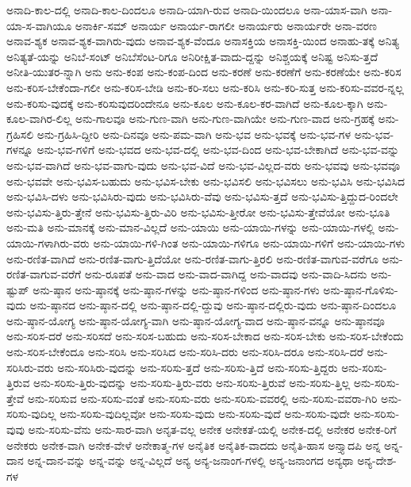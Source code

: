 {ಅನಾದಿ-ಕಾಲ-ದಲ್ಲಿ
ಅನಾದಿ-ಕಾಲ-ದಿಂದಲೂ
ಅನಾದಿ-ಯಾಗಿ-ರುವ
ಅನಾದಿ-ಯಿಂದಲೂ
ಅನಾ-ಯಾಸ-ವಾಗಿ
ಅನಾ-ಯಾ-ಸ-ವಾಗಿಯೂ
ಅನಾರ್ಕಿ-ಸಮ್
ಅನಾರ್ಯ
ಅನಾರ್ಯ-ರಾಗಲೀ
ಅನಾರ್ಯರು
ಅನಾರ್ಯರೇ
ಅನಾ-ವರಣ
ಅನಾವ-ಶ್ಯಕ
ಅನಾವ-ಶ್ಯಕ-ವಾಗಿರು-ವುದು
ಅನಾವ-ಶ್ಯಕ-ವೆಂದೂ
ಅನಾಸಕ್ತಿಯ
ಅನಾಸಕ್ತಿ-ಯಿಂದ
ಅನಾಹು-ತಕ್ಕೆ
ಅನಿತ್ಯ
ಅನಿತ್ಯತೆ-ಯನ್ನು
ಅನಿಬೆ-ಸಂಟ್
ಅನಿಬೆಸೆಂಟ-ರಿಗೂ
ಅನಿರೀಕ್ಷಿತ-ವಾದು-ದ್ದನ್ನು
ಅನಿಶ್ಚಯಕ್ಕೆ
ಅನಿಷ್ಟ
ಅನಿಸು-ತ್ತದೆ
ಅನೀತಿ-ಯುತರ-ನ್ನಾಗಿ
ಅನು
ಅನು-ಕಂಪ
ಅನು-ಕಂಪ-ದಿಂದ
ಅನು-ಕರಣೆ
ಅನು-ಕರಣೆಗೆ
ಅನು-ಕರಣೆಯೇ
ಅನು-ಕರಿಸ
ಅನು-ಕರಿಸ-ಬೇಕೆಂದಾ-ಗಲೀ
ಅನು-ಕರಿಸ-ಬೇಡಿ
ಅನು-ಕರಿ-ಸಲು
ಅನು-ಕರಿಸಿ
ಅನು-ಕರಿ-ಸುತ್ತ
ಅನು-ಕರಿಸು-ವವರ-ನ್ನಲ್ಲ
ಅನು-ಕರಿಸು-ವುದಕ್ಕೆ
ಅನು-ಕರಿಸುವುದರಿಂದೇನೂ
ಅನು-ಕೂಲ
ಅನು-ಕೂಲ-ಕರ-ವಾಗಿದೆ
ಅನು-ಕೂಲ-ಕ್ಕಾಗಿ
ಅನು-ಕೂಲ-ವಾಗಿರ-ಲಿಲ್ಲ
ಅನು-ಗಾಲವೂ
ಅನು-ಗುಣ-ವಾಗಿ
ಅನು-ಗುಣ-ವಾಗಿಯೇ
ಅನು-ಗುಣ-ವಾದ
ಅನು-ಗ್ರಹಕ್ಕೆ
ಅನು-ಗ್ರಹಿಸಲಿ
ಅನು-ಗ್ರಹಿಸಿ-ದ್ದೀರಿ
ಅನು-ದಿನವೂ
ಅನು-ಪಮ-ವಾಗಿ
ಅನು-ಭವ
ಅನು-ಭವಕ್ಕೆ
ಅನು-ಭವ-ಗಳ
ಅನು-ಭವ-ಗಳನ್ನೂ
ಅನು-ಭವ-ಗಳಿಗೆ
ಅನು-ಭವದ
ಅನು-ಭವ-ದಲ್ಲಿ
ಅನು-ಭವ-ದಿಂದ
ಅನು-ಭವ-ಬೇಕಾಗಿದೆ
ಅನು-ಭವ-ವನ್ನು
ಅನು-ಭವ-ವಾಗಿದೆ
ಅನು-ಭವ-ವಾಗು-ವುದು
ಅನು-ಭವ-ವಿದೆ
ಅನು-ಭವ-ವಿಲ್ಲದ-ವರು
ಅನು-ಭವವು
ಅನು-ಭವವೂ
ಅನು-ಭವವೇ
ಅನು-ಭವಿಸ-ಬಹುದು
ಅನು-ಭವಿಸ-ಬೇಕು
ಅನು-ಭವಿಸಲಿ
ಅನು-ಭವಿಸಲು
ಅನು-ಭವಿಸಿ
ಅನು-ಭವಿಸಿದ
ಅನು-ಭವಿಸಿ-ದಳು
ಅನು-ಭವಿಸಿರು-ವುದು
ಅನು-ಭವಿಸಿರು-ವೆವು
ಅನು-ಭವಿಸು-ತ್ತದೆ
ಅನು-ಭವಿಸು-ತ್ತಿದ್ದುದ-ರಿಂದಲೇ
ಅನು-ಭವಿಸು-ತ್ತಿರು-ತ್ತೇನೆ
ಅನು-ಭವಿಸು-ತ್ತಿರು-ವಿರಿ
ಅನು-ಭವಿಸು-ತ್ತೀರೋ
ಅನು-ಭವಿಸು-ತ್ತೇವೆಯೋ
ಅನು-ಭೂತಿ
ಅನು-ಮತಿ
ಅನು-ಮಾನಕ್ಕೆ
ಅನು-ಮಾನ-ವಿಲ್ಲದೆ
ಅನು-ಯಾಯಿ
ಅನು-ಯಾಯಿ-ಗಳನ್ನು
ಅನು-ಯಾಯಿ-ಗಳಲ್ಲಿ
ಅನು-ಯಾಯಿ-ಗಳಾಗಿರು-ವರು
ಅನು-ಯಾಯಿ-ಗಳಿ-ಗಿಂತ
ಅನು-ಯಾಯಿ-ಗಳಿಗೂ
ಅನು-ಯಾಯಿ-ಗಳಿಗೆ
ಅನು-ಯಾಯಿ-ಗಳು
ಅನು-ರಣಿತ-ವಾಗಿದೆ
ಅನು-ರಣಿತ-ವಾಗು-ತ್ತಿದೆಯೋ
ಅನು-ರಣಿತ-ವಾಗು-ತ್ತಿರಲಿ
ಅನು-ರಣಿತ-ವಾಗುವ-ವರೆಗೂ
ಅನು-ರಣಿತ-ವಾಗುವ-ವರೆಗೆ
ಅನು-ರೂಪತೆ
ಅನು-ವಾದ
ಅನು-ವಾದ-ವಾಗಿದ್ದ
ಅನು-ವಾದವು
ಅನು-ವಾದಿ-ಸಿದನು
ಅನು-ಷ್ಟುಪ್
ಅನು-ಷ್ಠಾನ
ಅನು-ಷ್ಠಾನಕ್ಕೆ
ಅನು-ಷ್ಠಾನ-ಗಳನ್ನು
ಅನು-ಷ್ಠಾನ-ಗಳಿಂದ
ಅನು-ಷ್ಠಾನ-ಗಳು
ಅನು-ಷ್ಠಾನ-ಗೊಳಿಸು-ವುದು
ಅನು-ಷ್ಠಾನದ
ಅನು-ಷ್ಠಾನ-ದಲ್ಲಿ
ಅನು-ಷ್ಠಾನ-ದಲ್ಲಿ-ದ್ದುವು
ಅನು-ಷ್ಠಾನ-ದಲ್ಲಿರು-ವುದು
ಅನು-ಷ್ಠಾನ-ದಿಂದಲೂ
ಅನು-ಷ್ಠಾನ-ಯೋಗ್ಯ
ಅನು-ಷ್ಠಾನ-ಯೋಗ್ಯ-ವಾಗಿ
ಅನು-ಷ್ಠಾನ-ಯೋಗ್ಯ-ವಾದ
ಅನು-ಷ್ಠಾನ-ವನ್ನೂ
ಅನು-ಷ್ಠಾನವೂ
ಅನು-ಸರಿಸ-ದರೆ
ಅನು-ಸರಿಸದೆ
ಅನು-ಸರಿಸ-ಬಹುದು
ಅನು-ಸರಿಸ-ಬೇಕಾದ
ಅನು-ಸರಿಸ-ಬೇಕು
ಅನು-ಸರಿಸ-ಬೇಕೆಂದು
ಅನು-ಸರಿಸ-ಬೇಕೆಂದೂ
ಅನು-ಸರಿಸಿ
ಅನು-ಸರಿಸಿದ
ಅನು-ಸರಿಸಿ-ದರು
ಅನು-ಸರಿಸಿ-ದರೂ
ಅನು-ಸರಿಸಿ-ದರೆ
ಅನು-ಸರಿಸಿರು-ವರು
ಅನು-ಸರಿಸಿರು-ವುದನ್ನು
ಅನು-ಸರಿಸು-ತ್ತದೆ
ಅನು-ಸರಿಸು-ತ್ತಿದೆ
ಅನು-ಸರಿಸು-ತ್ತಿದ್ದರು
ಅನು-ಸರಿಸು-ತ್ತಿರುವ
ಅನು-ಸರಿಸು-ತ್ತಿರು-ವುದನ್ನು
ಅನು-ಸರಿಸು-ತ್ತಿರು-ವರು
ಅನು-ಸರಿಸು-ತ್ತಿರುವೆ
ಅನು-ಸರಿಸು-ತ್ತಿಲ್ಲ
ಅನು-ಸರಿಸು-ತ್ತೇವೆ
ಅನು-ಸರಿಸುವ
ಅನು-ಸರಿಸು-ವಂತೆ
ಅನು-ಸರಿಸು-ವರು
ಅನು-ಸರಿಸು-ವವರಲ್ಲಿ
ಅನು-ಸರಿಸು-ವವರಾ-ಗಿರಿ
ಅನು-ಸರಿಸು-ವುದಿಲ್ಲ
ಅನು-ಸರಿಸು-ವುದಿಲ್ಲವೋ
ಅನು-ಸರಿಸು-ವುದು
ಅನು-ಸರಿಸು-ವುದೆ
ಅನು-ಸರಿಸು-ವುದೇ
ಅನು-ಸರಿಸು-ವುವು
ಅನು-ಸರಿಸು-ವೆನು
ಅನು-ಸಾರ-ವಾಗಿ
ಅನೃತ-ವಲ್ಲ
ಅನೇಕ
ಅನೇಕತೆ-ಯಲ್ಲಿ
ಅನೇಕ-ದಲ್ಲಿ
ಅನೇಕರ
ಅನೇಕ-ರಿಗೆ
ಅನೇಕರು
ಅನೇಕ-ವಾಗಿ
ಅನೇಕ-ವೇಳೆ
ಅನೇಕಾತ್ಮ-ಗಳ
ಅನೈತಿಕ
ಅನೈತಿಕ-ವಾದದು
ಅನೈತಿ-ಹಾಸ
ಅನ್ತ್ಯಾದಪಿ
ಅನ್ನ
ಅನ್ನ-ದಾನ
ಅನ್ನ-ದಾನ-ವನ್ನು
ಅನ್ನ-ವನ್ನು
ಅನ್ನ-ವಿಲ್ಲದೆ
ಅನ್ಯ
ಅನ್ಯ-ಜನಾಂಗ-ಗಳಲ್ಲಿ
ಅನ್ಯ-ಜನಾಂಗದ
ಅನ್ಯಥಾ
ಅನ್ಯ-ದೇಶ-ಗಳ
}
